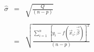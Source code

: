 


\(
\begin{array}{ccl}
\hat{\sigma} & = & \sqrt{\frac{Q}{(n-p)}} \\
             &   & \\
             & = & \sqrt{\frac{\sum_{i=1}^{n} \ [y_i - f(\vec{x}_i;\vec{\hat{\beta}})]^2}{(n-p)}}
\end{array}
\)



